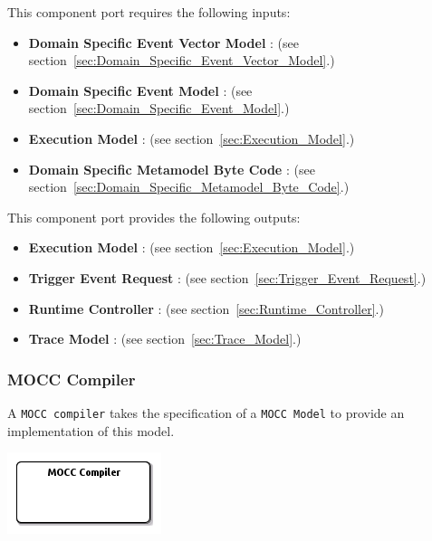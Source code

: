 \documentclass{gemoc} %
\begin{document}
This component port requires the following inputs:
\begin{itemize}
  \item \textbf{Domain Specific Event Vector Model} :
(see section~\ref{sec:Domain_Specific_Event_Vector_Model}.)
  \item \textbf{Domain Specific Event Model} :
(see section~\ref{sec:Domain_Specific_Event_Model}.)
  \item \textbf{Execution Model} :
(see section~\ref{sec:Execution_Model}.)
  \item \textbf{Domain Specific Metamodel Byte Code} :
(see section~\ref{sec:Domain_Specific_Metamodel_Byte_Code}.)
\end{itemize}

This component port provides the following outputs:
\begin{itemize}
  \item \textbf{Execution Model} :
(see section~\ref{sec:Execution_Model}.)
  \item \textbf{Trigger Event Request} :
(see section~\ref{sec:Trigger_Event_Request}.)
  \item \textbf{Runtime Controller} :
(see section~\ref{sec:Runtime_Controller}.)
  \item \textbf{Trace Model} :
(see section~\ref{sec:Trace_Model}.)
\end{itemize}


\subsubsection{MOCC Compiler}
\label{sec:MOCC_Compiler}
A \texttt{MOCC compiler} takes the specification of a \texttt{MOCC Model} to provide an implementation of this model.
\begin{center}
\includegraphics*[trim=0.0cm 0.0cm 0cm 0.0cm, clip=true]{../images/generated/Generated_MOCC_Compiler.png}
\end{center}
\end{document}
